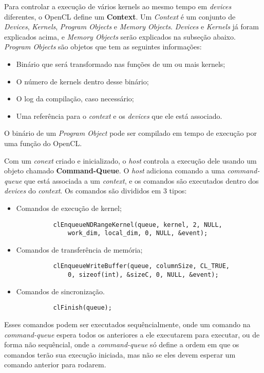 Para controlar a execução de vários kernels ao mesmo tempo em \textit{devices} diferentes, o OpenCL define um \textbf{Context}.
Um \textit{Context} é um conjunto de \textit{Devices}, \textit{Kernels}, \textit{Program Objects} e \textit{Memory Objects}.
\textit{Devices} e \textit{Kernels} já foram explicados acima, e \textit{Memory Objects} serão explicados na subseção abaixo.
\textit{Program Objects} são objetos que tem as seguintes informações:
\begin{itemize}
  \item Binário que será transformado nas funções de um ou mais kernels;
  \item O número de kernels dentro desse binário;
  \item O log da compilação, caso necessário;
  \item Uma referência para o \textit{context} e os \textit{devices} que ele está associado.
\end{itemize}

O binário de um \textit{Program Object} pode ser compilado em tempo de execução por uma função do OpenCL.

Com um \textit{conext} criado e inicializado, o \textit{host} controla a execução dele usando um objeto chamado \textbf{Command-Queue}.
O \textit{host} adiciona comando a uma \textit{command-queue} que está associada a um \textit{context}, e os comandos são executados
dentro dos \textit{devices} do \textit{context}. Os comandos são divididos em 3 tipos:
\begin{itemize}
  \item Comandos de execução de kernel;
        \begin{lstlisting}
          clEnqueueNDRangeKernel(queue, kernel, 2, NULL, 
              work_dim, local_dim, 0, NULL, &event);
        \end{lstlisting}
  \item Comandos de transferência de memória;
        \begin{lstlisting}
          clEnqueueWriteBuffer(queue, columnSize, CL_TRUE, 
              0, sizeof(int), &sizeC, 0, NULL, &event);
        \end{lstlisting}
  \item Comandos de sincronização.
        \begin{lstlisting}
          clFinish(queue);
        \end{lstlisting}
\end{itemize}
Esses comandos podem ser executados sequêncialmente, onde um comando na \textit{command-queue} espera todos os anteriores a ele executarem para
executar, ou de forma não sequêncial, onde a \textit{command-queue} só define a ordem em que os comandos terão sua execução iniciada, mas não se 
eles devem esperar um comando anterior para rodarem.

